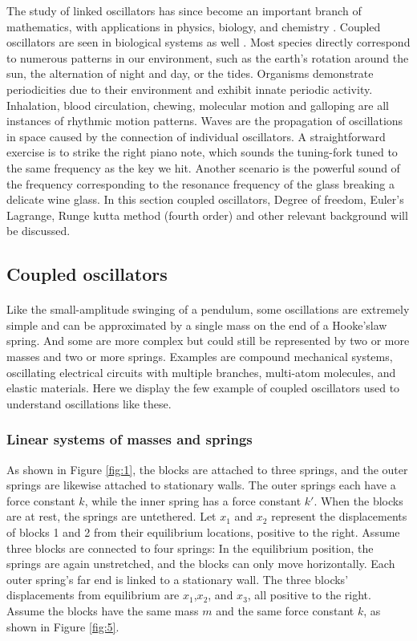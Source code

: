 The study of linked oscillators has since become an important branch of mathematics, with applications in physics, biology, and chemistry \cite{Chapter427:online}. Coupled oscillators are seen in biological systems as well \cite{winfree1967biological} \cite{hannay2018macroscopic}. Most species directly correspond to numerous patterns in our environment, such as the earth's rotation around the sun, the alternation of night and day, or the tides. Organisms demonstrate periodicities due to their environment and exhibit innate periodic activity. Inhalation, blood circulation, chewing, molecular motion and galloping are all instances of rhythmic motion patterns. Waves are the propagation of oscillations in space caused by the connection of individual oscillators. A straightforward exercise is to strike the right piano note, which sounds the tuning-fork tuned to the same frequency as the key we hit. Another scenario is the powerful sound of the frequency corresponding to the resonance frequency of the glass breaking a delicate wine glass. In this section coupled oscillators, Degree of freedom, Euler's Lagrange, Runge kutta method (fourth order) and other relevant background will be discussed. 


\subsection{Coupled oscillators}

\paragraph{}

Like the small-amplitude swinging of a pendulum, some oscillations are extremely simple and can be approximated by a single mass on the end of a Hooke'slaw spring. And some are more complex but could still be represented by two or more masses and two or more springs. Examples are compound mechanical systems, oscillating electrical circuits with multiple branches, multi-atom molecules, and elastic materials.  Here we display the few example of coupled oscillators used to understand oscillations like these.

\subsubsection{Linear systems of masses and springs}
As shown in Figure \ref{fig:1}, the blocks are attached to three springs, and the outer springs are likewise attached to stationary walls. The outer springs each have a force constant $k$, while the inner spring has a force constant $k'$. When the blocks are at rest, the springs are untethered. Let $x_1$ and $x_2$ represent the displacements of blocks 1 and 2 from their equilibrium locations, positive to the right. Assume three blocks are connected to four springs: In the equilibrium position, the springs are again unstretched, and the blocks can only move horizontally. Each outer spring's far end is linked to a stationary wall. The three blocks' displacements from equilibrium are $x_1$,$x_2$, and $x_3$, all positive to the right. Assume the blocks have the same mass $m$ and the same force constant $k$, as shown in Figure \ref{fig:5}.


